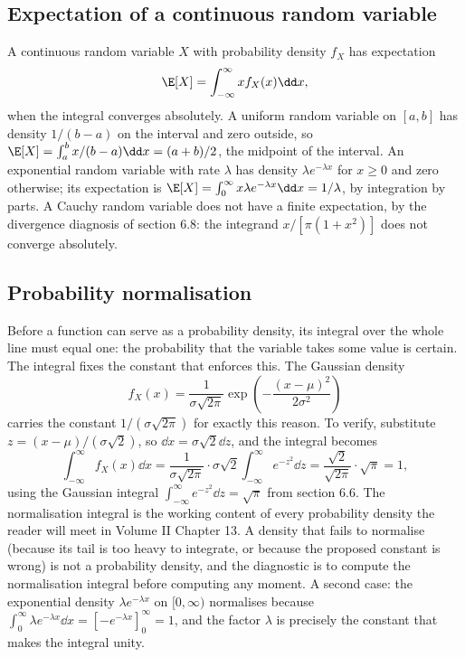 \subsection{Expectation of a continuous random variable}

A continuous random variable $X$ with probability density $f_{X}$
has expectation
\[
\E[X] = \int_{-\infty}^{\infty} x f_{X}(x) \dd x,
\]
when the integral converges absolutely. A uniform random variable on
$[a, b]$ has density $1/(b-a)$ on the interval and zero outside, so
$\E[X] = \int_{a}^{b} x/(b-a) \dd x = (a + b)/2$, the midpoint of
the interval. An exponential random variable with rate $\lambda$
has density $\lambda e^{-\lambda x}$ for $x \geq 0$ and zero
otherwise; its expectation is $\E[X] = \int_{0}^{\infty} x \lambda
e^{-\lambda x} \dd x = 1/\lambda$, by integration by parts. A
Cauchy random variable does not have a finite expectation, by the
divergence diagnosis of section 6.8: the integrand
$x/[\pi(1 + x^{2})]$ does not converge absolutely.

\subsection{Probability normalisation}

Before a function can serve as a probability density, its integral
over the whole line must equal one: the probability that the
variable takes some value is certain. The 
integral fixes the constant that enforces this. The Gaussian density
\[
f_{X}(x) = \frac{1}{\sigma\sqrt{2\pi}}\exp\!\left(-\frac{(x -
\mu)^{2}}{2\sigma^{2}}\right)
\]
carries the constant $1/(\sigma\sqrt{2\pi})$ for exactly this
reason. To verify, substitute $z = (x - \mu)/(\sigma\sqrt{2})$, so
$\dd x = \sigma\sqrt{2}\dd z$, and the integral becomes
\[
\int_{-\infty}^{\infty} f_{X}(x)\dd x = \frac{1}{\sigma\sqrt{2\pi}}
\cdot\sigma\sqrt{2}\int_{-\infty}^{\infty} e^{-z^{2}}\dd z =
\frac{\sqrt{2}}{\sqrt{2\pi}}\cdot\sqrt{\pi} = 1,
\]
using the Gaussian integral $\int_{-\infty}^{\infty} e^{-z^{2}}\dd z
= \sqrt{\pi}$ from section 6.6. The normalisation integral is the
working content of every probability density the reader will meet in
Volume II Chapter 13. A density that fails to normalise (because its
tail is too heavy to integrate, or because the proposed constant is
wrong) is not a probability density, and the diagnostic is to
compute the normalisation integral before computing any moment.
A second case: the exponential density $\lambda e^{-\lambda x}$ on
$[0, \infty)$ normalises because $\int_{0}^{\infty}\lambda
e^{-\lambda x}\dd x = [-e^{-\lambda x}]_{0}^{\infty} = 1$, and the
factor $\lambda$ is precisely the constant that makes the integral
unity.

